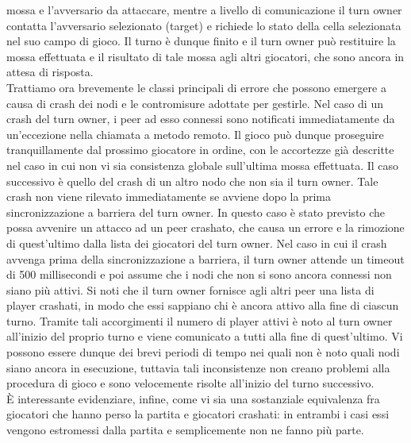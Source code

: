 mossa e l'avversario da attaccare, mentre a livello di comunicazione il turn 
owner contatta l'avversario selezionato (target) e richiede lo stato della 
cella selezionata nel suo campo di gioco. Il turno è dunque finito e il turn 
owner può restituire la mossa effettuata e il risultato di tale mossa agli 
altri giocatori, che sono ancora in attesa di risposta.
\\
Trattiamo ora brevemente le classi principali di errore che possono emergere a 
causa di crash dei nodi e le contromisure adottate per gestirle. Nel caso di 
un crash del turn owner, i peer ad esso connessi sono notificati 
immediatamente da un'eccezione nella chiamata a metodo remoto. Il gioco può 
dunque proseguire tranquillamente dal prossimo giocatore in ordine, con le 
accortezze già descritte nel caso in cui non vi sia consistenza globale 
sull'ultima mossa effettuata. Il caso successivo è quello del crash di un altro 
nodo che non sia il turn owner. Tale crash non viene rilevato immediatamente 
se avviene dopo la prima sincronizzazione a barriera del turn owner. In questo 
caso è stato previsto che possa avvenire un attacco ad un peer crashato, che 
causa un errore e la rimozione di quest'ultimo dalla lista dei giocatori del 
turn owner. Nel caso in cui il crash avvenga prima della sincronizzazione a 
barriera, il turn owner attende un timeout di 500 
millisecondi e poi assume che i nodi che non si sono ancora connessi non siano più attivi.
Si noti che il turn owner fornisce agli altri peer una lista di 
player crashati, in modo che essi sappiano chi è ancora attivo alla fine di 
ciascun turno. Tramite tali accorgimenti il numero di player attivi è noto al 
turn owner all'inizio del proprio turno e viene comunicato a tutti alla fine di 
quest'ultimo. Vi possono essere dunque dei brevi periodi di tempo nei quali non 
è noto quali nodi siano ancora in esecuzione, tuttavia tali inconsistenze non 
creano problemi alla procedura di gioco e sono velocemente risolte all'inizio 
del turno successivo.
\\
È interessante evidenziare, infine, come vi sia una sostanziale equivalenza fra 
giocatori che hanno perso la partita e giocatori crashati: in entrambi i casi 
essi vengono estromessi dalla partita e semplicemente non ne fanno più parte.